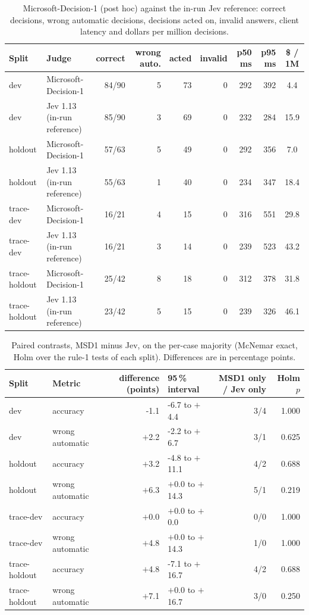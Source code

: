 \documentclass[11pt,letterpaper]{article}
\begin{document}
\begin{table}[htbp]\centering\footnotesize\setlength\tabcolsep{4pt}
\caption{Microsoft-Decision-1 (post hoc) against the in-run Jev reference: correct decisions, wrong automatic decisions,
decisions acted on, invalid answers, client latency and dollars per million decisions.}\label{tab:msd1}
\begin{tabular*}{\textwidth}{@{\extracolsep{\fill}}l l r r r r r r S[table-format=2.1]@{}}
\toprule
Split & Judge & correct & {wrong auto.} & {acted} & {invalid} & {p50 ms} & {p95 ms} & {\$ / 1M} \\
\midrule
dev & Microsoft-Decision-1 & 84/90 & 5 & 73 & 0 & 292 & 392 & 4.4 \\
dev & Jev 1.13 (in-run reference) & 85/90 & 3 & 69 & 0 & 232 & 284 & 15.9 \\
\addlinespace[2pt]
holdout & Microsoft-Decision-1 & 57/63 & 5 & 49 & 0 & 292 & 356 & 7.0 \\
holdout & Jev 1.13 (in-run reference) & 55/63 & 1 & 40 & 0 & 234 & 347 & 18.4 \\
\addlinespace[2pt]
trace-dev & Microsoft-Decision-1 & 16/21 & 4 & 15 & 0 & 316 & 551 & 29.8 \\
trace-dev & Jev 1.13 (in-run reference) & 16/21 & 3 & 14 & 0 & 239 & 523 & 43.2 \\
\addlinespace[2pt]
trace-holdout & Microsoft-Decision-1 & 25/42 & 8 & 18 & 0 & 312 & 378 & 31.8 \\
trace-holdout & Jev 1.13 (in-run reference) & 23/42 & 5 & 15 & 0 & 239 & 326 & 46.1 \\
\bottomrule
\end{tabular*}
\end{table}
\begin{table}[htbp]\centering\footnotesize\setlength\tabcolsep{4pt}
\caption{Paired contrasts, MSD1 minus Jev, on the per-case majority (McNemar exact, Holm over the rule-1 tests of each
split). Differences are in percentage points.}\label{tab:msd1con}
\begin{tabular*}{\textwidth}{@{\extracolsep{\fill}}l l r l r r@{}}
\toprule
Split & Metric & {difference (points)} & 95\,\% interval & {MSD1 only / Jev only} & {Holm $p$} \\
\midrule
dev & accuracy & -1.1 & -6.7 to $+$4.4 & 3/4 & 1.000 \\
dev & wrong automatic & $+$2.2 & -2.2 to $+$6.7 & 3/1 & 0.625 \\
holdout & accuracy & $+$3.2 & -4.8 to $+$11.1 & 4/2 & 0.688 \\
holdout & wrong automatic & $+$6.3 & $+$0.0 to $+$14.3 & 5/1 & 0.219 \\
trace-dev & accuracy & $+$0.0 & $+$0.0 to $+$0.0 & 0/0 & 1.000 \\
trace-dev & wrong automatic & $+$4.8 & $+$0.0 to $+$14.3 & 1/0 & 1.000 \\
trace-holdout & accuracy & $+$4.8 & -7.1 to $+$16.7 & 4/2 & 0.688 \\
trace-holdout & wrong automatic & $+$7.1 & $+$0.0 to $+$16.7 & 3/0 & 0.250 \\
\bottomrule
\end{tabular*}
\end{table}
\end{document}
